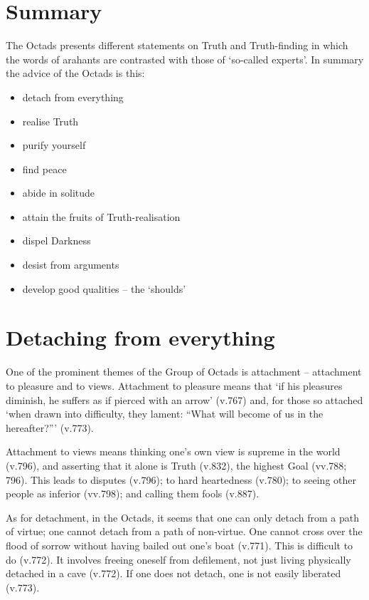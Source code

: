 
\section*{Summary}

The Octads presents different statements on Truth and Truth-finding in which the words of arahants are contrasted with those of `so-called experts'. In summary the advice of the Octads is this:

\begin{itemize}
\item detach from everything
\item realise Truth
\item purify yourself
\item find peace
\item abide in solitude
\item attain the fruits of Truth-realisation
\item dispel Darkness
\item desist from arguments
\item develop good qualities -- the `shoulds'
\end{itemize}

\section*{Detaching from everything}

One of the prominent themes of the Group of Octads is attachment -- attachment to pleasure and to views. Attachment to pleasure means that `if his pleasures diminish, he suffers as if pierced with an arrow' (v.767) and, for those so attached `when drawn into difficulty, they lament: ``What will become of us in the hereafter?''\thinspace' (v.773).

Attachment to views means thinking one's own view is supreme in the world (v.796), and asserting that it alone is Truth (v.832), the highest Goal (vv.788; 796). This leads to disputes (v.796); to hard heartedness (v.780); to seeing other people as inferior (vv.798); and calling them fools (v.887).

As for detachment, in the Octads, it seems that one can only detach from a path of virtue; one cannot detach from a path of non-virtue. One cannot cross over the flood of sorrow without having bailed out one's boat (v.771). This is difficult to do (v.772). It involves freeing oneself from defilement, not just living physically detached in a cave (v.772). If one does not detach, one is not easily liberated (v.773).

